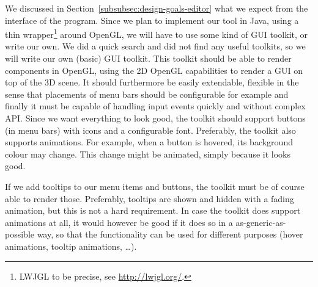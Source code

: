 We discussed in Section~\ref{subsubsec:design-goals-editor} what we expect from the interface of the program. Since we plan to implement our tool in Java, using a thin wrapper\footnote{LWJGL to be precise, see \url{http://lwjgl.org/}.} around OpenGL, we will have to use some kind of GUI toolkit, or write our own. We did a quick search and did not find any useful toolkits, so we will write our own (basic) GUI toolkit. This toolkit should be able to render components in OpenGL, using the 2D OpenGL capabilities to render a GUI on top of the 3D scene. It should furthermore be easily extendable, flexible in the sense that placements of menu bars should be configurable for example and finally it must be capable of handling input events quickly and without complex API. Since we want everything to look good, the toolkit should support buttons (in menu bars) with icons and a configurable font. Preferably, the toolkit also supports animations. For example, when a button is hovered, its background colour may change. This change might be animated, simply because it looks good.

If we add tooltips to our menu items and buttons, the toolkit must be of course able to render those. Preferably, tooltips are shown and hidden with a fading animation, but this is not a hard requirement. In case the toolkit does support animations at all, it would however be good if it does so in a as-generic-as-possible way, so that the functionality can be used for different purposes (hover animations, tooltip animations, \ldots).